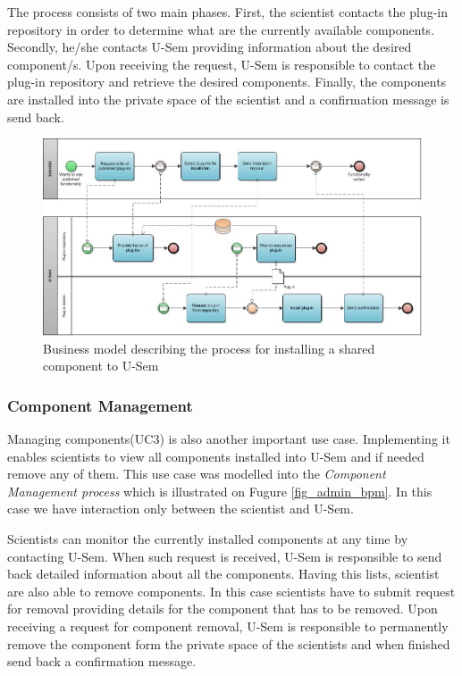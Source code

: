 The process consists of two main phases. First, the scientist contacts the plug-in repository in order to determine what are the currently available components. Secondly, he/she contacts U-Sem providing information about the desired component/s. Upon receiving the request, U-Sem is responsible to contact the plug-in repository and retrieve the desired components. Finally, the components are installed into the private space of the scientist and a confirmation message is send back.

\begin{figure}[h!]
  \centering
  	\includegraphics[scale=0.7,angle=90]{plug-in/business_processes/InstallPlugInFromRepoBusinessModel.jpg}
  \caption{Business model describing the process for installing a shared component to U-Sem}
  \label{fig_repo_bpm}
\end{figure}

\subsubsection{Component Management}

Managing components(UC3) is also another important use case. Implementing it enables scientists to view all components installed into U-Sem and if needed remove any of them. This use case was modelled into the \textit{Component Management process} which is illustrated on Fugure \ref{fig_admin_bpm}. In this case we have interaction only between the scientist and U-Sem.

Scientists can monitor the currently installed components at any time by contacting U-Sem. When such request is received, U-Sem is responsible to send back detailed information about all the components. Having this lists, scientist are also able to remove components. In this case scientists have to submit request for removal providing details for the component that has to be removed. Upon receiving a request for component removal, U-Sem is responsible to permanently remove the component form the private space of the scientists and when finished send back a confirmation message.


